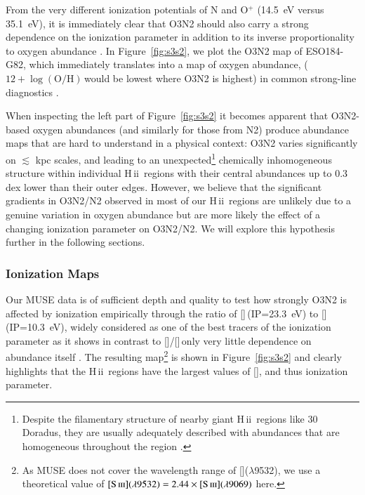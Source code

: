 \documentclass[traditabstract]{aa}
\newcommand{\hii}{\mbox{H\,{\sc ii}}}
\newcommand{\oh}{$12+\log(\mathrm{O/H})$}
\newcommand{\sii}{[\ion{S}{ii}]}
\newcommand{\siii}{[\ion{S}{iii}]}
\newcommand{\oii}{[\ion{O}{ii}]}
\newcommand{\oiii}{[\ion{O}{iii}]}
\begin{document}
From the very different ionization potentials of N and O$^{+}$ (14.5~eV versus 35.1~eV), it is immediately clear that O3N2 should also carry a strong dependence on the ionization parameter in addition to its inverse proportionality to oxygen abundance \citep[e.g.][]{1979A&A....78..200A, 2015MNRAS.448.2030H}. In Figure~\ref{fig:s3s2}, we plot the O3N2 map of ESO184-G82, which immediately translates into a map of oxygen abundance, (\oh\,would be lowest where O3N2 is highest) in common strong-line diagnostics \citep{2004MNRAS.348L..59P}.

When inspecting the left part of Figure~\ref{fig:s3s2} it becomes apparent that O3N2-based oxygen abundances  (and similarly for those from N2) produce abundance maps that are hard to understand in a physical context: O3N2 varies significantly on $\lesssim$ kpc scales, and leading to an unexpected\footnote{Despite the filamentary structure of nearby giant \hii~regions like 30 Doradus, they are usually adequately described with abundances that are homogeneous throughout the region \citep[e.g.][and references therein]{2011ApJ...738...34P}.} chemically inhomogeneous structure within individual \hii~regions with their central abundances up to 0.3 dex lower than their outer edges. However, we believe that the significant gradients in O3N2/N2 observed in most of our \hii~regions are unlikely due to a genuine variation in oxygen abundance but are more likely the effect of a changing ionization parameter on O3N2/N2. We will explore this hypothesis further in the following sections.

\subsubsection{Ionization Maps}

Our MUSE data is of sufficient depth and quality to test how strongly O3N2 is affected by ionization empirically through the ratio of \siii\,(IP=23.3~eV) to \sii\,(IP=10.3~eV), widely considered as one of the best tracers of the ionization parameter \citep{1991MNRAS.253..245D} as it shows in contrast to \oiii/\oii\,only very little dependence on abundance itself \citep{2002ApJS..142...35K, 2011MNRAS.415.3616D}. The resulting map\footnote{As MUSE does not cover the wavelength range of \siii($\lambda$9532), we use a theoretical value of $\siii(\lambda9532)=2.44\times\siii(\lambda9069)$ \citep{1982MNRAS.199.1025M} here.} is shown in Figure~\ref{fig:s3s2} and clearly highlights that the \hii~regions have the largest values of \siii, and thus ionization parameter. 
\end{document}
